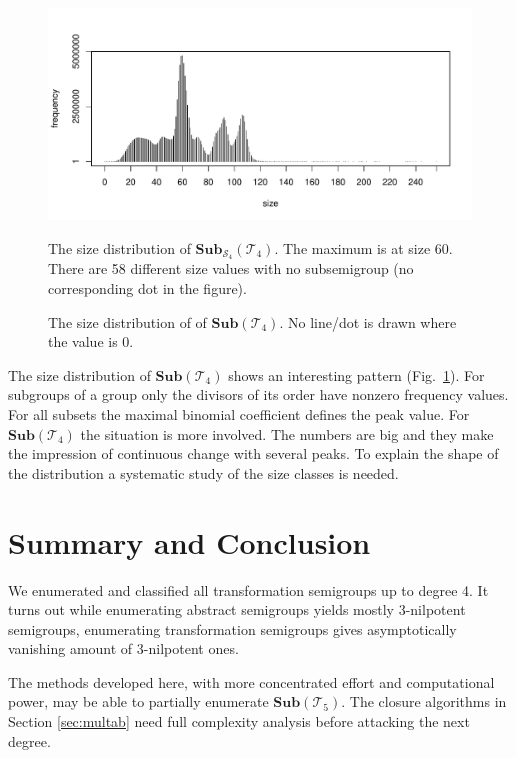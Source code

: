\documentclass{amsart}
\newcommand{\cT}{{\mathcal T}}
\newcommand{\cS}{{\mathcal S}}
\newcommand{\Sub}{\mathbf{Sub}}
\theoremstyle{plain}
\theoremstyle{definition}
\begin{document}
\begin{figure}
\includegraphics[width=\textwidth]{SubT4distrib}
\caption{The size distribution of $\Sub_{\cS_4}(\cT_4)$. The maximum is at size 60. There are 58 different size values with no subsemigroup (no corresponding dot in the figure).}
\caption{The size distribution of of $\Sub(\cT_4)$. No line/dot is drawn where the value is 0.}
\label{fig:SubT4SizeDistrib}
\end{figure}
The size distribution of $\Sub(\cT_4)$ shows an interesting pattern (Fig.\ \ref{fig:SubT4SizeDistrib}).
For subgroups of a group only the divisors of its order have nonzero frequency values.
For all subsets the maximal binomial coefficient defines the peak value.
For $\Sub(\cT_4)$ the situation is more involved.
The numbers are big and they make the impression of continuous change with several peaks.
To explain the shape of the  distribution a systematic study of the size classes is needed. 
\section{Summary and Conclusion}
We enumerated and classified all transformation semigroups up to degree 4.
It turns out while enumerating abstract semigroups yields mostly 3-nilpotent semigroups, enumerating transformation semigroups gives asymptotically vanishing amount of 3-nilpotent ones.

The methods developed here, with more concentrated effort and computational power,  may be able to partially enumerate $\Sub(\cT_5)$.
The closure algorithms in Section \ref{sec:multab} need full complexity analysis before attacking the next degree. 
\end{document}
